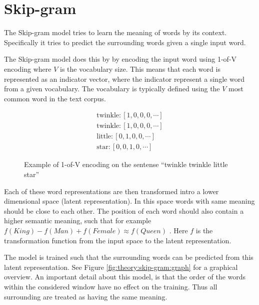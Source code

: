 
\section{Skip-gram}

The Skip-gram model tries to learn the meaning of words by its context. Specifically it tries to predict the surrounding words given a single input word.

The Skip-gram model does this by by encoding the input word using 1-of-V encoding where $V$ is the vocabulary size. This means that each word is represented as an indicator vector, where the indicator represent a single word from a given vocabulary. The vocabulary is typically defined using the $V$ most common word in the text corpus. 
\begin{figure}[h]
\begin{equation*}
\begin{aligned}
\text{twinkle}: \left[1, 0, 0, 0, \cdots \right] \\
\text{twinkle}: \left[1, 0, 0, 0, \cdots \right] \\
\text{little}: \left[0, 1, 0, 0, \cdots \right] \\
\text{star}: \left[0, 0, 1, 0, \cdots \right]
\end{aligned}
\end{equation*}
\caption{Example of 1-of-V encoding on the sentense ``twinkle twinkle little star''}
\end{figure}

Each of these word representations are then transformed intro a lower dimensional space (latent representation). In this space words with same meaning should be close to each other. The position of each word should also contain a higher semantic meaning, such that for example $f(King) - f(Man) + f(Female) \approx f(Queen)$ \cite{word2vec-comparing}. Here $f$ is the transformation function from the input space to the latent representation.

The model is trained such that the surrounding words can be predicted from this latent representation. See Figure \ref{fig:theory:skip-gram:graph} for a graphical overview. An important detail about this model, is that the order of the words within the considered window have no effect on the training. Thus all surrounding are treated as having the same meaning.

